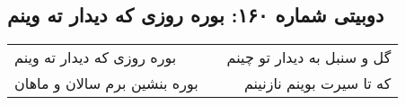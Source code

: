 \begin{center}
\section*{دوبیتی شماره ۱۶۰: بوره روزی که دیدار ته وینم}
\label{sec:160}
\begin{longtable}{l p{0.5cm} r}
بوره روزی که دیدار ته وینم
&&
گل و سنبل به دیدار تو چینم
\\
بوره بنشین برم سالان و ماهان
&&
که تا سیرت بوینم نازنینم
\\
\end{longtable}
\end{center}
